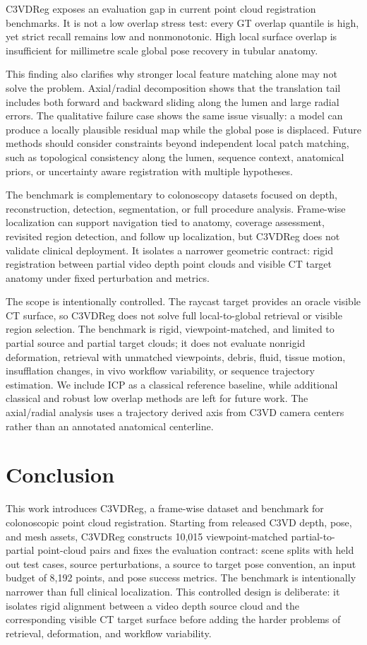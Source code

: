 \documentclass{bmvc2k}
\begin{document}
C3VDReg exposes an evaluation gap in current point cloud registration benchmarks. It is not a low overlap stress test: every GT overlap quantile is high, yet strict recall remains low and nonmonotonic. High local surface overlap is insufficient for millimetre scale global pose recovery in tubular anatomy.

This finding also clarifies why stronger local feature matching alone may not solve the problem. Axial/radial decomposition shows that the translation tail includes both forward and backward sliding along the lumen and large radial errors. The qualitative failure case shows the same issue visually: a model can produce a locally plausible residual map while the global pose is displaced. Future methods should consider constraints beyond independent local patch matching, such as topological consistency along the lumen, sequence context, anatomical priors, or uncertainty aware registration with multiple hypotheses.

The benchmark is complementary to colonoscopy datasets focused on depth, reconstruction, detection, segmentation, or full procedure analysis. Frame-wise localization can support navigation tied to anatomy, coverage assessment, revisited region detection, and follow up localization, but C3VDReg does not validate clinical deployment. It isolates a narrower geometric contract: rigid registration between partial video depth point clouds and visible CT target anatomy under fixed perturbation and metrics.

The scope is intentionally controlled. The raycast target provides an oracle visible CT surface, so C3VDReg does not solve full local-to-global retrieval or visible region selection. The benchmark is rigid, viewpoint-matched, and limited to partial source and partial target clouds; it does not evaluate nonrigid deformation, retrieval with unmatched viewpoints, debris, fluid, tissue motion, insufflation changes, in vivo workflow variability, or sequence trajectory estimation. We include ICP as a classical reference baseline, while additional classical and robust low overlap methods are left for future work. The axial/radial analysis uses a trajectory derived axis from C3VD camera centers rather than an annotated anatomical centerline.

\section{Conclusion}
\label{sec:conclusion}

This work introduces C3VDReg, a frame-wise dataset and benchmark for colonoscopic point cloud registration. Starting from released C3VD depth, pose, and mesh assets, C3VDReg constructs 10,015 viewpoint-matched partial-to-partial point-cloud pairs and fixes the evaluation contract: scene splits with held out test cases, source perturbations, a source to target pose convention, an input budget of 8,192 points, and pose success metrics. The benchmark is intentionally narrower than full clinical localization. This controlled design is deliberate: it isolates rigid alignment between a video depth source cloud and the corresponding visible CT target surface before adding the harder problems of retrieval, deformation, and workflow variability.
\end{document}
